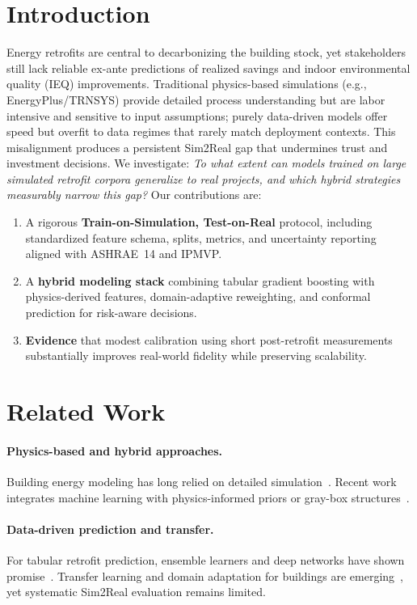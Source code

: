 \documentclass{article}
\begin{document}
\section{Introduction}
Energy retrofits are central to decarbonizing the building stock, yet stakeholders still lack reliable ex-ante predictions of realized savings and indoor environmental quality (IEQ) improvements. Traditional physics-based simulations (e.g., EnergyPlus/TRNSYS) provide detailed process understanding but are labor intensive and sensitive to input assumptions; purely data-driven models offer speed but overfit to data regimes that rarely match deployment contexts. This misalignment produces a persistent Sim2Real gap that undermines trust and investment decisions. 
We investigate: \emph{To what extent can models trained on large simulated retrofit corpora generalize to real projects, and which hybrid strategies measurably narrow this gap?}
Our contributions are:
\begin{enumerate}[leftmargin=8mm]
\item A rigorous \textbf{Train-on-Simulation, Test-on-Real} protocol, including standardized feature schema, splits, metrics, and uncertainty reporting aligned with ASHRAE~14 and IPMVP.
\item A \textbf{hybrid modeling stack} combining tabular gradient boosting with physics-derived features, domain-adaptive reweighting, and conformal prediction for risk-aware decisions.
\item \textbf{Evidence} that modest calibration using short post-retrofit measurements substantially improves real-world fidelity while preserving scalability.
\end{enumerate}

\section{Related Work}
\paragraph{Physics-based and hybrid approaches.} Building energy modeling has long relied on detailed simulation~\citep{crawley2001energyplus,klein2017trnsys,wang2015modelica}. Recent work integrates machine learning with physics-informed priors or gray-box structures~\citep{drgona2020all,heinen2022flexibility}. 
\paragraph{Data-driven prediction and transfer.} For tabular retrofit prediction, ensemble learners and deep networks have shown promise~\citep{ahmad2017review,li2021review,smarra2018data}. Transfer learning and domain adaptation for buildings are emerging~\citep{hong2020transfer,mahnke2022transfer,li2022domain}, yet systematic Sim2Real evaluation remains limited. 
\end{document}
